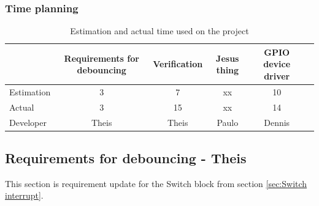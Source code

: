 \subsubsection{Time planning}

\begin{table}[H]
\centering
	\begin{tabular}{|l|c|c|c|c|c|}
		\hline
		~			& Requirements for debouncing	& Verification			& Jesus thing		& GPIO device driver	\\ \hline
		Estimation	& 3							& 7					& xx				& 10			\\
		Actual		& 3 							& 15					& xx				& 14			\\
		Developer	& Theis						& Theis				& Paulo			& Dennis		\\
		\hline
	\end{tabular}
	\caption{Estimation and actual time used on the project}
\end{table}
\subsection{Requirements for debouncing - Theis}
%
This section is requirement update for the Switch block from section \ref{sec:Switch interrupt}.
